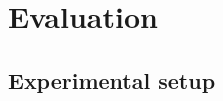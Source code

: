 \chapter{Evaluation}
\label{chap:evaluation}

\section{Experimental setup}
\label{sec:experimentalSetup}

